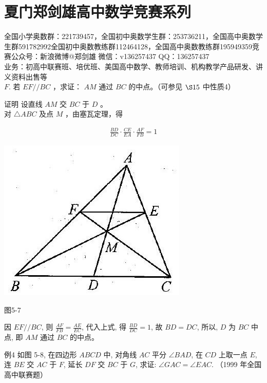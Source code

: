 \documentclass[10pt]{article}
\begin{document}
\section*{夏门郑剑雄高中数学竞赛系列}
全国小学奥数群：221739457，全国初中奥数学生群：253736211，全国高中奥数学生群591782992全国初中奥数教练群112464128，全国高中奥数教练群195949359竞赛公众号：新浪微博@郑剑雄 微信：v136257437 QQ：136257437\\
业务：初高中联赛班、培优班、美国高中数学、教师培训、机构教学产品研发、讲义资料出售等\\
$F$. 若 $E F / / B C$ ，求证： $A M$ 通过 $B C$ 的中点。（可参见 $\S 15$ 中性质4）

证明 设直线 $A M$ 交 $B C$ 于 $D$ 。\\
对 $\triangle A B C$ 及点 $M$ ，由塞瓦定理，得

\begin{align*}
\frac{B D}{D C} \cdot \frac{C E}{E A} \cdot \frac{A F}{F B}=1
\end{align*}

\begin{center}
\includegraphics[max width=\textwidth]{2024_10_30_2c8f45efd4a519b08e1ag-051}
\end{center}

图5-7

因 $E F / / B C$, 则 $\frac{A F}{F B}=\frac{A E}{E C}$, 代入上式, 得 $\frac{B D}{D C}=1$, 故 $B D=D C$, 所以, $D$ 为 $B C$ 中点, 即 $A M$ 通过 $B C$ 的中点。

例4 如图 5-8, 在四边形 $A B C D$ 中, 对角线 $A C$ 平分 $\angle B A D$, 在 $C D$ 上取一点 $E$, 连 $B E$ 交 $A C$ 于 $F$, 延长 $D F$ 交 $B C$ 于 $G$, 求证: $\angle G A C=\angle E A C$. （1999 年全国高中联赛题）
\end{document}

